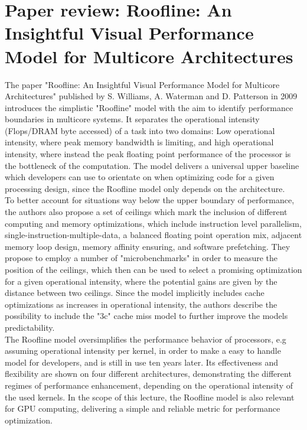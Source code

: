 \section{Paper review: Roofline: An Insightful Visual Performance Model for Multicore Architectures}
The paper "Roofline: An Insightful Visual Performance Model for Multicore Architectures" published by S. Williams, A. Waterman and D. Patterson in 2009 introduces the simplistic "Roofline" model with the aim to identify performance boundaries in multicore systems. It separates the operational intensity (Flops/DRAM byte accessed) of a task into two domains: Low operational intensity, where peak memory bandwidth is limiting, and high operational intensity, where instead the peak floating point performance of the processor is the bottleneck of the computation. The model delivers a universal upper baseline which developers can use to orientate on when optimizing code for a given processing design, since the Roofline model only depends on the architecture.\\
To better account for situations way below the upper boundary of performance, the authors also propose a set of ceilings which mark the inclusion of different computing and memory optimizations, which include instruction level parallelism, single-instruction-multiple-data, a balanced floating point operation mix, adjacent memory loop design, memory affinity ensuring, and software prefetching. They propose to employ a number of "microbenchmarks" in order to measure the position of the ceilings, which then can be used to select a promising optimization for a given operational intensity, where the potential gains are given by the distance between two ceilings. Since the model implicitly includes cache optimizations as increases in operational intensity, the authors describe the possibility to include the "3c" cache miss model to further improve the models predictability.\\
The Roofline model oversimplifies the performance behavior of processors, e.g assuming operational intensity per kernel, in order to make a easy to handle model for developers, and is still in use ten years later. Its effectiveness and flexibility are shown on four different architectures, demonstrating the different regimes of performance enhancement, depending on the operational intensity of the used kernels. In the scope of this lecture, the Roofline model is also relevant for GPU computing, delivering a simple and reliable metric for performance optimization.




